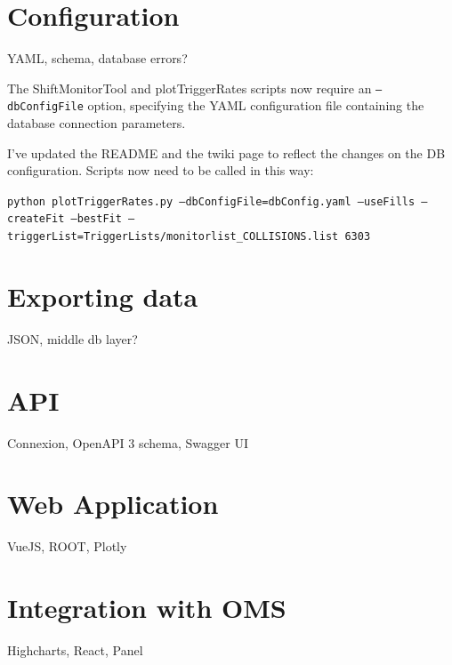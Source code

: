 \section{Configuration}

YAML, schema, database errors?

The ShiftMonitorTool and plotTriggerRates scripts now require an \texttt{--dbConfigFile} option, specifying the YAML configuration file containing the database connection parameters.

I've updated the README and the twiki page to reflect the changes on the DB configuration. Scripts now need to be called in this way:

\texttt{python plotTriggerRates.py --dbConfigFile=dbConfig.yaml --useFills --createFit --bestFit --triggerList=TriggerLists/monitorlist\_COLLISIONS.list 6303}

\section{Exporting data}

JSON, middle db layer?

\section{API}

Connexion, OpenAPI 3 schema, Swagger UI

\section{Web Application}

VueJS, ROOT, Plotly

\section{Integration with OMS}

Highcharts, React, Panel



